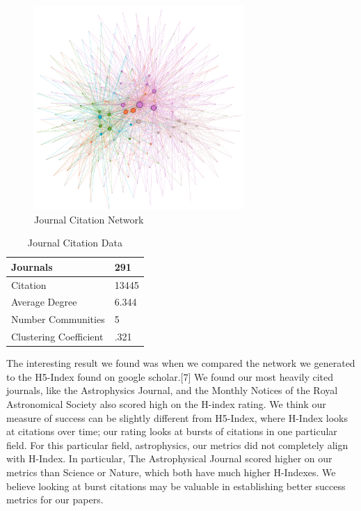 \documentclass[times, 10pt,twocolumn]{article}
\begin{document}
\begin{figure}[h]
   \includegraphics[width=8cm]{figure3.png}
   \caption{Journal Citation Network}
\end{figure}

\begin{table}[h]
\centering
\caption{Journal Citation Data}
\label{my-label}
\begin{tabular}{|l|l|}
\hline
Journals               & 291   \\ \hline
Citation               & 13445 \\ \hline
Average Degree         & 6.344 \\ \hline
Number Communities     & 5     \\ \hline
Clustering Coefficient & .321  \\ \hline
\end{tabular}
\end{table}

The interesting result we found was when we compared the network we generated to the H5-Index found on google scholar.[7] We found our most heavily cited journals, like the Astrophysics Journal, and the Monthly Notices of the Royal Astronomical Society also scored high on the H-index rating. We think our measure of success can be slightly different from H5-Index, where H-Index looks at citations over time; our rating looks at bursts of citations in one particular field. For this particular field, astrophysics, our metrics did not completely align with H-Index. In particular, The Astrophysical Journal scored higher on our metrics than Science or Nature, which both have much higher H-Indexes. We believe looking at burst citations may be valuable in establishing better success metrics for our papers.\\
\end{document}
